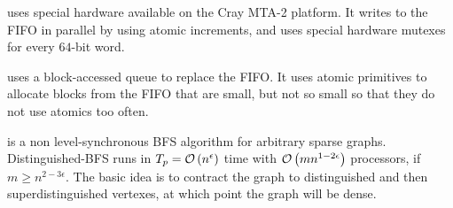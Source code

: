 \cite{cray-bfs} uses special hardware available on the Cray MTA-2 platform.  It writes to the FIFO in parallel by using atomic increments, and uses special hardware mutexes for every $64$-bit word.

\cite{block-queue-bfs} uses a block-accessed queue to replace the FIFO.  It uses atomic primitives to allocate blocks from the FIFO that are small, but not so small so that they do not use atomics too often.

\cite{distinguished-bfs} is a non level-synchronous BFS algorithm for arbitrary sparse graphs. Distinguished-BFS runs in $T_p = {\mathcal O}\left({n^\epsilon}\right)$ time with ${\mathcal O}\left({mn^{1-2\epsilon}}\right)$ processors, if $m\geq n^{2-3\epsilon}$.  The basic idea is to contract the graph to distinguished and then superdistinguished vertexes, at which point the graph will be dense.

